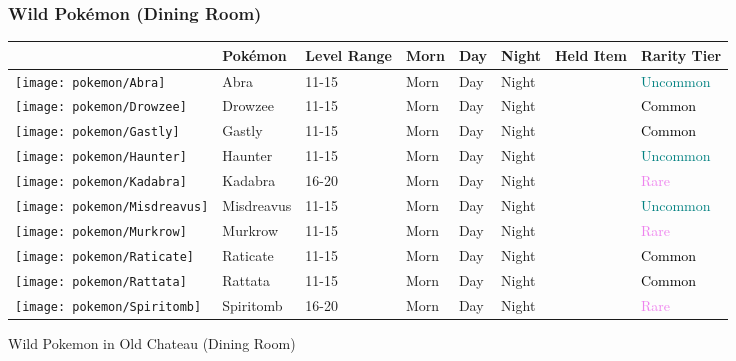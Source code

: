 \subsubsection{Wild Pokémon (Dining Room)}%
\label{ssubsec:WildPokmon(DiningRoom)}%
\begin{longtable}{||l l l l l l l l||}%
\hline%
&Pokémon&Level Range&Morn&Day&Night&Held Item&Rarity Tier\\%
\hline%
\endhead%
\hline%
\texttt{[image: pokemon/Abra]}&Abra&11{-}15&Morn&Day&Night&&\textcolor{teal}{%
Uncommon%
}\\%
\hline%
\texttt{[image: pokemon/Drowzee]}&Drowzee&11{-}15&Morn&Day&Night&&\textcolor{black}{%
Common%
}\\%
\hline%
\texttt{[image: pokemon/Gastly]}&Gastly&11{-}15&Morn&Day&Night&&\textcolor{black}{%
Common%
}\\%
\hline%
\texttt{[image: pokemon/Haunter]}&Haunter&11{-}15&Morn&Day&Night&&\textcolor{teal}{%
Uncommon%
}\\%
\hline%
\texttt{[image: pokemon/Kadabra]}&Kadabra&16{-}20&Morn&Day&Night&&\textcolor{violet}{%
Rare%
}\\%
\hline%
\texttt{[image: pokemon/Misdreavus]}&Misdreavus&11{-}15&Morn&Day&Night&&\textcolor{teal}{%
Uncommon%
}\\%
\hline%
\texttt{[image: pokemon/Murkrow]}&Murkrow&11{-}15&Morn&Day&Night&&\textcolor{violet}{%
Rare%
}\\%
\hline%
\texttt{[image: pokemon/Raticate]}&Raticate&11{-}15&Morn&Day&Night&&\textcolor{black}{%
Common%
}\\%
\hline%
\texttt{[image: pokemon/Rattata]}&Rattata&11{-}15&Morn&Day&Night&&\textcolor{black}{%
Common%
}\\%
\hline%
\texttt{[image: pokemon/Spiritomb]}&Spiritomb&16{-}20&Morn&Day&Night&&\textcolor{violet}{%
Rare%
}\\%
\hline%
\end{longtable}%
\caption{Wild Pokemon in Old Chateau (Dining Room)}